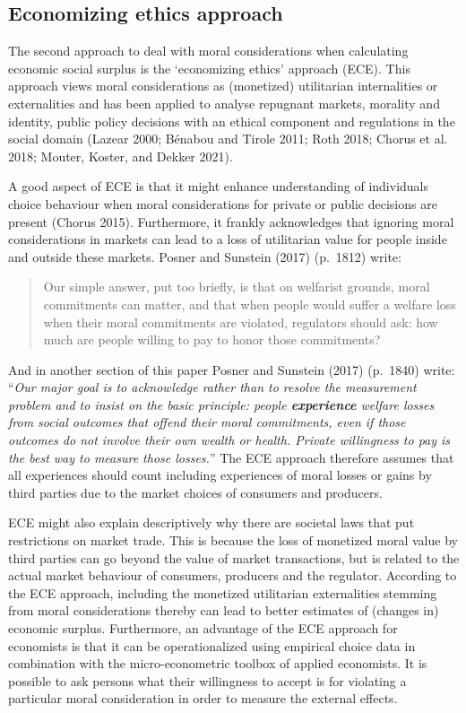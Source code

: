 \documentclass[
]{book}
\begin{document}
\hypertarget{economizing-ethics-approach}{%
\subsection{Economizing ethics approach}\label{economizing-ethics-approach}}

The second approach to deal with moral considerations when calculating economic social surplus is the `economizing ethics' approach (ECE). This approach views moral considerations as (monetized) utilitarian internalities or externalities and has been applied to analyse repugnant markets, morality and identity, public policy decisions with an ethical component and regulations in the social domain (Lazear 2000; Bénabou and Tirole 2011; Roth 2018; Chorus et al. 2018; Mouter, Koster, and Dekker 2021).

A good aspect of ECE is that it might enhance understanding of individuals choice behaviour when moral considerations for private or public decisions are present (Chorus 2015). Furthermore, it frankly acknowledges that ignoring moral considerations in markets can lead to a loss of utilitarian value for people inside and outside these markets. Posner and Sunstein (2017) (p.~1812) write:

\begin{quote}
Our simple answer, put too briefly, is that on welfarist grounds, moral commitments can matter, and that when people would suffer a welfare loss when their moral commitments are violated, regulators should ask: how much are people willing to pay to honor those commitments?
\end{quote}

And in another section of this paper Posner and Sunstein (2017) (p.~1840) write: ``\emph{Our major goal is to acknowledge rather than to resolve the measurement problem and to insist on the basic principle: people \textbf{experience} welfare losses from social outcomes that offend their moral commitments, even if those outcomes do not involve their own wealth or health. Private willingness to pay is the best way to measure those losses.}'' The ECE approach therefore assumes that all experiences should count including experiences of moral losses or gains by third parties due to the market choices of consumers and producers.

ECE might also explain descriptively why there are societal laws that put restrictions on market trade. This is because the loss of monetized moral value by third parties can go beyond the value of market transactions, but is related to the actual market behaviour of consumers, producers and the regulator. According to the ECE approach, including the monetized utilitarian externalities stemming from moral considerations thereby can lead to better estimates of (changes in) economic surplus. Furthermore, an advantage of the ECE approach for economists is that it can be operationalized using empirical choice data in combination with the micro-econometric toolbox of applied economists. It is possible to ask persons what their willingness to accept is for violating a particular moral consideration in order to measure the external effects.
\end{document}
